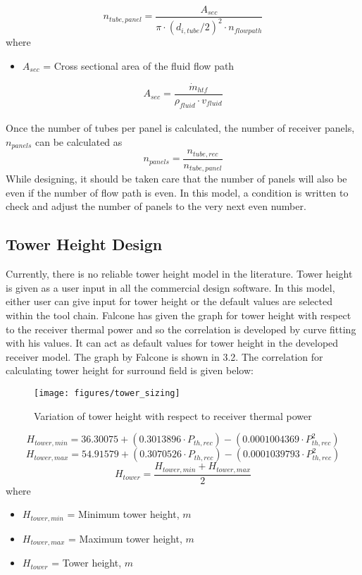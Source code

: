 \begin{equation}
	n_{tube,panel} = \frac{A_{sec}} {\pi \cdot (d_{i,tube} / 2)^2 \cdot n_{flowpath}}
\end{equation}
where
\begin{itemize}
	\item $A_{sec}$ = Cross sectional area of the fluid flow path
\end{itemize}
\begin{equation}
	A_{sec} = \frac{\dot m_{htf}} {\rho_{fluid} \cdot v_{fluid}}
\end{equation}\\
Once the number of tubes per panel is calculated, the number of receiver panels, $n_{panels}$ can be calculated as
\begin{equation}
	n_{panels} = \frac{n_{tube,rec}} {n_{tube,panel}}
\end{equation}
While designing, it should be taken care that the number of panels will also be even if the number of flow path is even.  In this model, a condition is written to check and adjust the number of panels to the very next even number.
\subsection{Tower Height Design}
Currently, there is no reliable tower height model in the literature. Tower height is given as a user input in all the commercial design software. In this model, either user can give input for tower height or the default values are selected within the tool chain. Falcone \cite{Falcone.1986} has given the graph for tower height with respect to the receiver thermal power and so the correlation is developed by curve fitting with his values. It can act as default values for tower height in the developed receiver model. The graph by Falcone is shown in \figurename{ 3.2}. The correlation for calculating tower height for surround field is given below:
\begin{figure}[h]
	\texttt{[image: figures/tower\_sizing]}
	\centering
	\caption{Variation of tower height with respect to receiver thermal power \cite{Falcone.1986}}
\end{figure}
\begin{equation}
	H_{tower,min} = 36.30075 + (0.3013896 \cdot P_{th,rec}) - (0.0001004369 \cdot P_{th,rec}^2)
\end{equation}
\begin{equation}
	H_{tower,max}= 54.91579 + (0.3070526 \cdot P_{th,rec}) - (0.0001039793 \cdot P_{th,rec}^2)
\end{equation}       
\begin{equation}
	H_{tower} = \frac{H_{tower,min} + H_{tower,max}} {2}
\end{equation}
where
\begin{itemize}
	\item $H_{tower,min}$ = Minimum tower height, $m$
	\item $H_{tower,max}$ = Maximum tower height, $m$
	\item $H_{tower}$ = Tower height, $m$
\end{itemize} 

